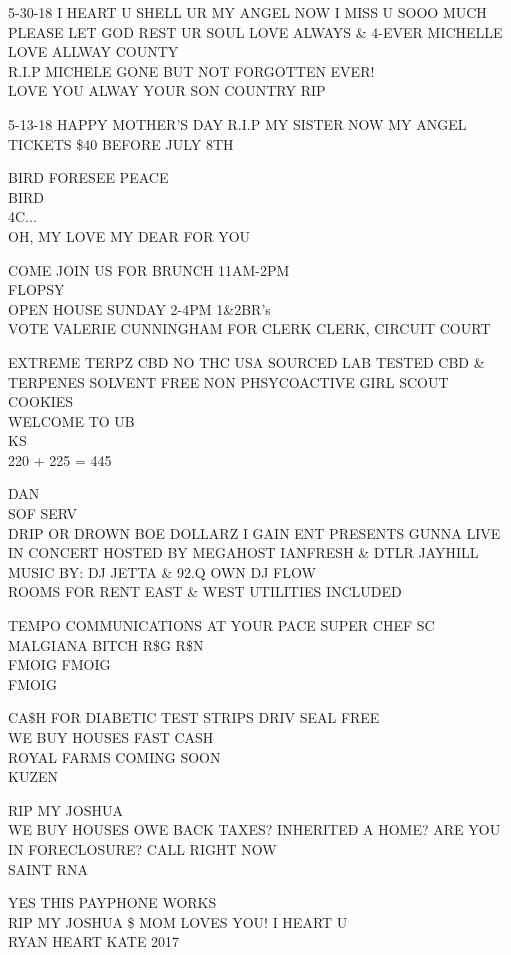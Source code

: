 \documentclass[10pt,letterpaper]{article}
\begin{document}
5{-}30{-}18 I HEART U SHELL UR MY ANGEL NOW I MISS U SOOO MUCH PLEASE LET GOD REST UR SOUL LOVE ALWAYS \& 4{-}EVER MICHELLE\\
LOVE ALLWAY COUNTY\\
R.I.P MICHELE GONE BUT NOT FORGOTTEN EVER!\\
LOVE YOU ALWAY YOUR SON COUNTRY RIP

5{-}13{-}18 HAPPY MOTHER'S DAY R.I.P MY SISTER NOW MY ANGEL\\
TICKETS \$40 BEFORE JULY 8TH

BIRD FORESEE PEACE\\
BIRD\\
4C...\\
OH, MY LOVE MY DEAR FOR YOU

COME JOIN US FOR BRUNCH 11AM{-}2PM\\
FLOPSY\\
OPEN HOUSE SUNDAY 2{-}4PM 1\&2BR's\\
VOTE VALERIE CUNNINGHAM FOR CLERK CLERK, CIRCUIT COURT

EXTREME TERPZ CBD NO THC USA SOURCED LAB TESTED CBD \& TERPENES SOLVENT FREE NON PHSYCOACTIVE GIRL SCOUT COOKIES\\
WELCOME TO UB\\
KS\\
220 + 225 = 445

DAN\\
SOF SERV\\
DRIP OR DROWN BOE DOLLARZ I GAIN ENT PRESENTS GUNNA LIVE IN CONCERT HOSTED BY MEGAHOST IANFRESH \& DTLR JAYHILL MUSIC BY: DJ JETTA \& 92.Q OWN DJ FLOW\\
ROOMS FOR RENT EAST \& WEST UTILITIES INCLUDED

TEMPO COMMUNICATIONS AT YOUR PACE SUPER CHEF SC\\
MALGIANA BITCH R\$G R\$N\\
FMOIG FMOIG\\
FMOIG

CA\$H FOR DIABETIC TEST STRIPS DRIV SEAL FREE\\
WE BUY HOUSES FAST CASH\\
ROYAL FARMS COMING SOON\\
KUZEN

RIP MY JOSHUA\\
WE BUY HOUSES OWE BACK TAXES?  INHERITED A HOME?  ARE YOU IN FORECLOSURE?  CALL RIGHT NOW\\
SAINT RNA

YES THIS PAYPHONE WORKS\\
RIP MY JOSHUA \$ MOM LOVES YOU!  I HEART U\\
RYAN HEART KATE 2017
\end{document}
